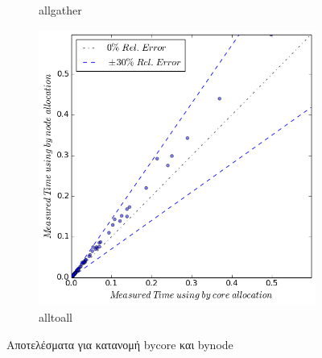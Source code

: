 \begin{figure}[ht]
\begin{subfigure}[b]{0.40\textwidth}
        \caption{allgather}
    \end{subfigure}
    \quad 
     \begin{subfigure}[b]{0.40\textwidth}
        \includegraphics[width=\textwidth]{./images/bycore_vs_bynode/alltoall.png}
        \caption{alltoall}
    \end{subfigure}
    \caption{Αποτελέσματα για κατανομή bycore και bynode}
    \label{fig:bycore_vs_bynode}
\end{figure}


	
